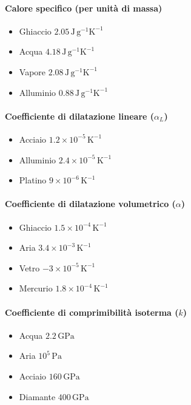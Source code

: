 \documentclass[10pt, oneside]{book}
\begin{document}
\paragraph{Calore specifico (per unità di massa)}
\begin{itemize}
\item Ghiaccio \dotfill $ 2.05 \, \mathrm{J \, g^{-1} K^{-1}}$
\item Acqua \dotfill $ 4.18 \, \mathrm{J \, g^{-1} K^{-1}}$
\item Vapore \dotfill $ 2.08 \, \mathrm{J \, g^{-1} K^{-1}}$
\item Alluminio \dotfill $ 0.88 \, \mathrm{J \, g^{-1} K^{-1}}$
\end{itemize}
\paragraph{Coefficiente di dilatazione lineare ($\alpha_L$)}
\begin{itemize}
\item Acciaio \dotfill $1.2 \times 10^{-5} \, \mathrm{K^{-1}}$
\item Alluminio \dotfill $2.4 \times 10^{-5} \, \mathrm{K^{-1}}$
\item Platino \dotfill $9 \times 10^{-6} \, \mathrm{K^{-1}}$
\end{itemize}
\paragraph{Coefficiente di dilatazione volumetrico ($\alpha$)}
\begin{itemize}
\item Ghiaccio \dotfill $1.5 \times 10^{-4} \, \mathrm{K^{-1}}$
\item Aria \dotfill $3.4 \times 10^{-3} \, \mathrm{K^{-1}}$
\item Vetro \dotfill $-3 \times 10^{-5} \, \mathrm{K^{-1}}$
\item Mercurio \dotfill $1.8 \times 10^{-4}\, \mathrm{K^{-1}}$
\end{itemize}
\paragraph{Coefficiente di comprimibilità isoterma ($k$)}
\begin{itemize}
\item Acqua \dotfill $2.2 \, \mathrm{GPa}$
\item Aria \dotfill $10^{5} \, \mathrm{Pa}$
\item Acciaio \dotfill $ 160 \, \mathrm{GPa}$ 
\item Diamante \dotfill $400 \, \mathrm{GPa}$
\end{itemize}
\end{document}
